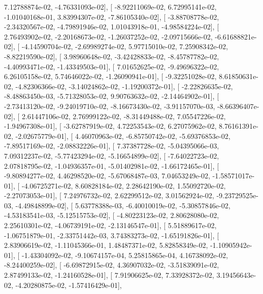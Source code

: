 \documentclass{article}
\begin{document}
          7.12788874e-02,  -4.76331093e-02],
       [ -8.92211069e-02,   6.72995141e-02,  -1.01040168e-01,
          3.83994307e-02,  -7.86105340e-02],
       [ -3.88708778e-02,  -2.34320567e-02,  -4.79891946e-02,
          1.01043918e-01,  -4.98584224e-02],
       [  2.76493902e-02,  -2.20168673e-02,  -1.26037252e-02,
         -2.09715666e-02,  -6.61688821e-02],
       [ -4.14590704e-02,  -2.69989274e-02,   5.97715010e-02,
          7.25908342e-02,  -8.82219590e-02],
       [  3.98960648e-02,  -3.42428833e-02,  -8.45787782e-02,
         -4.40993471e-02,  -1.43349503e-01],
       [  7.01652625e-02,  -9.49696322e-02,   6.26105158e-02,
          5.74646022e-02,  -1.26090941e-01],
       [ -9.32251028e-02,   8.61850631e-02,  -4.82306366e-02,
         -3.14024862e-02,  -1.19200372e-01],
       [ -2.22826635e-02,  -8.48863450e-03,  -5.71328053e-02,
          9.90763632e-02,  -2.14464902e-01],
       [ -2.73413120e-02,  -9.24019710e-02,  -8.16673430e-02,
         -3.91157070e-03,  -8.66396407e-02],
       [  2.61447106e-02,   2.76999122e-02,  -8.31449488e-02,
          7.05547226e-02,  -1.94967308e-01],
       [ -3.62787919e-02,   4.72253543e-02,   6.27075962e-02,
          8.76161391e-02,  -2.02675779e-01],
       [  4.46070963e-02,  -6.85750742e-02,  -5.69376853e-02,
         -7.89517169e-02,  -2.08832226e-01],
       [  7.37387728e-02,  -5.04395066e-03,   7.09312237e-02,
         -5.77423294e-02,  -5.16654899e-02],
       [ -7.64022723e-02,   2.07818795e-02,  -1.04936357e-01,
         -5.01402981e-02,  -1.66172465e-01],
       [ -9.80894277e-02,   4.46298520e-02,  -5.67068487e-03,
          7.04653249e-02,  -1.58571017e-01],
       [ -4.06725271e-02,   8.60828184e-02,   2.28642190e-02,
          1.55092720e-02,  -2.27073053e-01],
       [  7.24976732e-02,   2.62299512e-02,   3.01562924e-02,
         -9.23729525e-03,  -4.49848899e-02],
       [  5.63778388e-03,  -6.40010019e-02,  -5.30857846e-02,
         -4.53183541e-03,  -5.12515753e-02],
       [ -4.80223123e-02,   2.80628080e-02,   2.25610301e-02,
         -4.06739191e-02,  -2.13146547e-01],
       [  5.51889617e-02,  -1.06751879e-01,  -2.33751442e-03,
          3.74383273e-02,  -1.65191826e-01],
       [  2.83906619e-02,  -1.11045366e-01,   1.48487371e-02,
          5.82858349e-02,  -1.10905942e-01],
       [ -1.43304092e-02,  -9.10674157e-04,   5.25815865e-04,
          4.16738092e-02,  -8.24400259e-02],
       [ -6.69872915e-02,   4.36907032e-02,  -3.51839091e-02,
          2.87499133e-02,  -1.24160528e-01],
       [  7.91906625e-02,   7.33928372e-02,   3.19456643e-02,
         -4.20280875e-02,  -1.57416429e-01],
\end{document}
